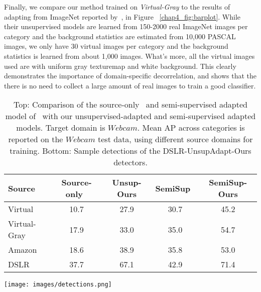 \documentclass[graybox]{svmult}
\begin{document}
Finally, we compare our method trained on \textit{Virtual-Gray} to the results of adapting from ImageNet reported by~\cite{ICRA14}, in Figure ~\ref{chap4_fig:barplot}.
While their unsupervised models are learned from 150-2000 real ImageNet images per category and the background statistics are estimated from 10,000 PASCAL images, we only have 30 virtual images per category and the background statistics is learned from about 1,000 images. What's more, all the virtual images used are with uniform gray texturemap and white background. This clearly demonstrates the importance of domain-specific decorrelation, and shows that the there is no need to collect a large amount of real images to train a good classifier. 

\begin{table}
\begin{small}
\begin{center}
\begin{tabular}{|l||c|c||c|c|}
\hline
Source & Source-only~\cite{who} & Unsup-Ours & SemiSup~\cite{ICRA14} & SemiSup-Ours \\ 
\hline
Virtual & 10.7  &  27.9 & 30.7 & 45.2 \\ \hline
Virtual-Gray  & 17.9 & 33.0 & 35.0 & 54.7 \\ \hline
Amazon        & 18.6 & 38.9 & 35.8 & 53.0 \\ \hline
DSLR          & 37.7 & 67.1 & 42.9 & 71.4 \\ \hline
\end{tabular}
\texttt{[image: images/detections.png]}
\end{center}
\caption{\small Top: Comparison of the source-only~\cite{who} and semi-supervised adapted model of~\cite{ICRA14} with our unsupervised-adapted and semi-supervised adapted models. Target domain is $Webcam$. Mean AP across categories is reported on the $Webcam$ test data, using different source domains for training. Bottom: Sample detections of the DSLR-UnsupAdapt-Ours detectors.}
\label{tab:office}
\end{small}
\end{table}
\end{document}
